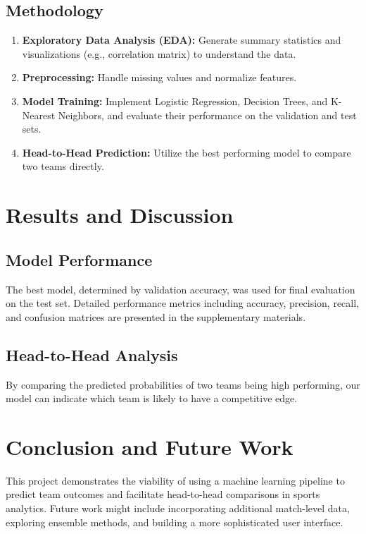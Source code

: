 \documentclass[a4paper,12pt]{article}
\begin{document}
\subsection{Methodology}
\begin{enumerate}
    \item \textbf{Exploratory Data Analysis (EDA):} Generate summary statistics and visualizations (e.g., correlation matrix) to understand the data.
    \item \textbf{Preprocessing:} Handle missing values and normalize features.
    \item \textbf{Model Training:} Implement Logistic Regression, Decision Trees, and K-Nearest Neighbors, and evaluate their performance on the validation and test sets.
    \item \textbf{Head-to-Head Prediction:} Utilize the best performing model to compare two teams directly.
\end{enumerate}

\section{Results and Discussion}
\subsection{Model Performance}
The best model, determined by validation accuracy, was used for final evaluation on the test set. Detailed performance metrics including accuracy, precision, recall, and confusion matrices are presented in the supplementary materials.

\subsection{Head-to-Head Analysis}
By comparing the predicted probabilities of two teams being high performing, our model can indicate which team is likely to have a competitive edge.

\section{Conclusion and Future Work}
This project demonstrates the viability of using a machine learning pipeline to predict team outcomes and facilitate head-to-head comparisons in sports analytics. Future work might include incorporating additional match-level data, exploring ensemble methods, and building a more sophisticated user interface.



\end{document}
